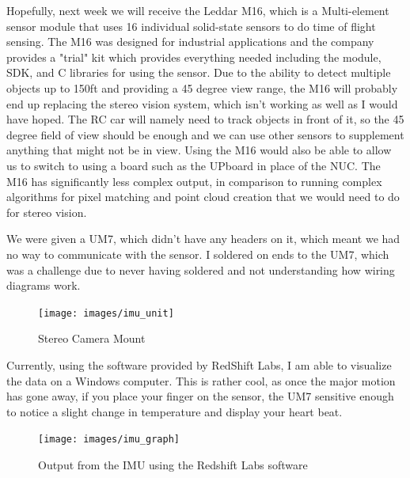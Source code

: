 \documentclass[compsoc,draftclsnofoot,onecolumn,10pt]{IEEEtran}
\begin{document}
		Hopefully, next week we will receive the Leddar M16, which is a Multi-element sensor module that uses 16 individual solid-state sensors to do time of flight sensing. 
		The M16 was designed for industrial applications and the company provides a "trial" kit which provides everything needed including the module, SDK, and C libraries for using the sensor.
		Due to the ability to detect multiple objects up to 150ft and providing a 45 degree view range, the M16 will probably end up replacing the stereo vision system, which isn't working as well as I would have hoped. 
		The RC car will namely need to track objects in front of it, so the 45 degree field of view should be enough and we can use other sensors to supplement anything that might not be in view.
		Using the M16 would also be able to allow us to switch to using a board such as the UPboard in place of the NUC.
		The M16 has significantly less complex output, in comparison to running complex algorithms for pixel matching and point cloud creation that we would need to do for stereo vision. 
		
		We were given a UM7, which didn't have any headers on it, which meant we had no way to communicate with the sensor. 
		I soldered on ends to the UM7, which was a challenge due to never having soldered and not understanding how wiring diagrams work.
		
		\begin{figure}[H]
 		\centering
		\texttt{[image: images/imu\_unit]}
		\caption{Stereo Camera Mount}
		\end{figure}
		
		Currently, using the software provided by RedShift Labs, I am able to visualize the data on a Windows computer. 
		This is rather cool, as once the major motion has gone away, if you place your finger on the sensor, the UM7 sensitive enough to notice a slight change in temperature and display your heart beat. 
		\begin{figure}[H]
 		\centering
		\texttt{[image: images/imu\_graph]}
		\caption{Output from the IMU using the Redshift Labs software}
		\end{figure}
		
		
\end{document}
